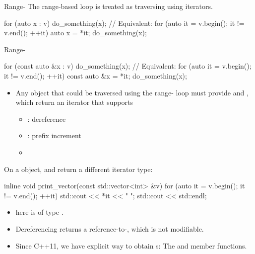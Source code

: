 \begin{frame}[fragile]{Range-}
    The range-based  loop is treated as traversing using iterators.
    \begin{cpp}
for (auto x : v)
  do_something(x);
// Equivalent:
for (auto it = v.begin(); it != v.end(); ++it) {
  auto x = *it;
  do_something(x);
}
    \end{cpp}
\end{frame}

\begin{frame}[fragile]{Range-}
    \begin{cpp}
for (const auto &x : v)
  do_something(x);
// Equivalent:
for (auto it = v.begin(); it != v.end(); ++it) {
  const auto &x = *it;
  do_something(x);
}
    \end{cpp}
    \pause
    \begin{itemize}
        \item Any object that could be traversed using the range- loop must provide  and , which return an iterator that supports
        \begin{itemize}
            \item {}: dereference
            \item {}: prefix increment
            \item {}
        \end{itemize}
    \end{itemize}
\end{frame}

\begin{frame}[fragile]{}
    On a \const object,  and  return a different iterator type:
    \begin{cpp}
inline void print_vector(const std::vector<int> &v) {
  for (auto it = v.begin(); it != v.end(); ++it)
    std::cout << *it << " ";
  std::cout << std::endl;
}
    \end{cpp}
    \begin{itemize}
        \item {} here is of type .
        \item Dereferencing  returns a reference-to-, which is not modifiable.
        \item Since C++11, we have explicit way to obtain s: The  and  member functions.
    \end{itemize}
\end{frame}

